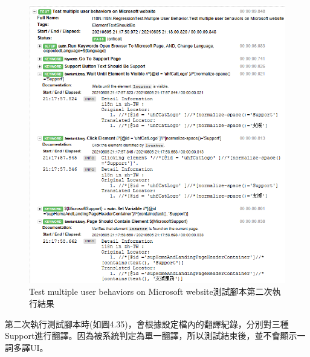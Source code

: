 \begin{figure}[H]
\includegraphics[width= \textwidth]{../論文截圖/4-4-3 test multiple user behaviors測試腳本2nd run.png}
\caption{Test multiple user behaviors on Microsoft website測試腳本第二次執行結果}
\end{figure}

第二次執行測試腳本時(如圖4.35)，會根據設定檔內的翻譯紀錄，分別對三種Support進行翻譯。因為被系統判定為單一翻譯，所以測試結束後，並不會顯示一詞多譯UI。
